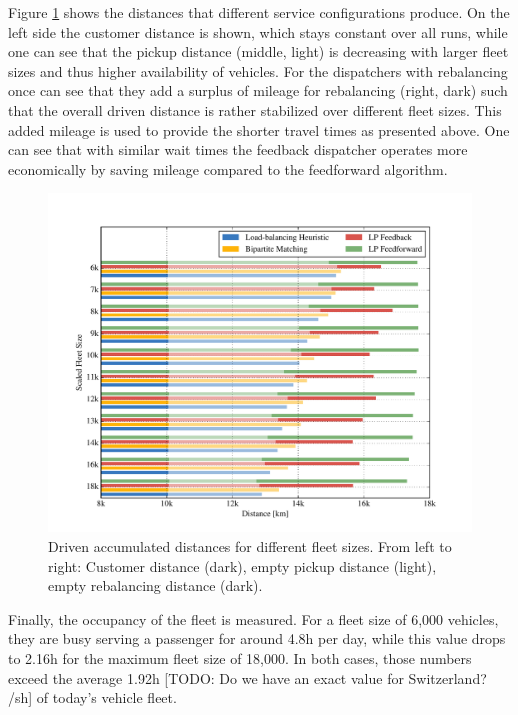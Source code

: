 
Figure \ref{fig:distances} shows the distances that different service configurations
produce. On the left side the customer distance is shown, which stays constant
over all runs, while one can see that the pickup distance (middle, light) is decreasing
with larger fleet sizes and thus higher availability of vehicles. For the dispatchers
with rebalancing once can see that they add a surplus of mileage for rebalancing (right, dark)
such that the overall driven distance is rather stabilized over different fleet sizes.
This added mileage is used to provide the shorter travel times as presented above.
One can see that with similar wait times the feedback dispatcher operates more economically
by saving mileage compared to the feedforward algorithm.

\begin{figure}
\includegraphics[width=1.0\textwidth]{figures/distances.pdf}
\caption{Driven accumulated distances for different fleet sizes. From left to right:
Customer distance (dark), empty pickup distance (light), empty rebalancing distance (dark).}
\label{fig:distances}
\end{figure}

Finally, the occupancy of the fleet is measured. For a fleet size of 6,000
vehicles, they are busy serving a passenger for around 4.8h per day, while
this value drops to 2.16h for the maximum fleet size of 18,000. In both cases,
those numbers exceed the average 1.92h [TODO: Do we have an exact value for Switzerland? /sh] of today's vehicle fleet.


